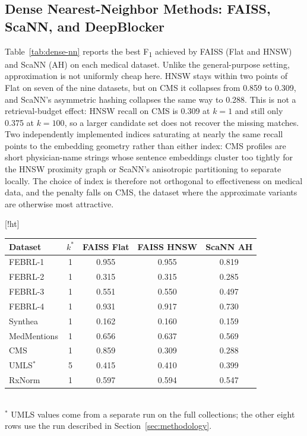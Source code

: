 \documentclass[runningheads]{llncs}
\makeatletter
\renewenvironment{table}
  {\setlength\abovecaptionskip{0\p@}%
   \setlength\belowcaptionskip{7\p@}%
   \@float{table}}
  {\end@float}
\makeatother
\begin{document}
\subsection{Dense Nearest-Neighbor Methods: FAISS, ScaNN, and DeepBlocker}
\label{sec:results-nn}

Table~\ref{tab:dense-nn} reports the best F\textsubscript{1} achieved by FAISS (Flat and HNSW)
and ScaNN (AH) on each medical dataset. Unlike the general-purpose setting, approximation is
not uniformly cheap here. HNSW stays within two points of Flat on seven of the nine datasets,
but on CMS it collapses from 0.859 to 0.309, and ScaNN's asymmetric hashing collapses the same
way to 0.288. This is not a retrieval-budget effect: HNSW recall on CMS is 0.309 at $k=1$ and
still only 0.375 at $k=100$, so a larger candidate set does not recover the missing matches.
Two independently implemented indices saturating at nearly the same recall points to the
embedding geometry rather than either index: CMS profiles are short physician-name strings
whose sentence embeddings cluster too tightly for the HNSW proximity graph or ScaNN's
anisotropic partitioning to separate locally. The choice of index is therefore not orthogonal to effectiveness on medical data, and the penalty falls on CMS, the dataset where the approximate variants are otherwise most attractive.

\begin{table}[!ht]
\centering
\caption{Dense NN best F\textsubscript{1} per medical dataset over
$k \in \{1,5,10,20,50,100\}$, using 384-dimensional \texttt{all-MiniLM-L6-v2} embeddings.
F\textsubscript{1} decreases monotonically in $k$ beyond $k^{*}$. Only F\textsubscript{1} is
shown: at $k^{*}=1$ on the datasets where $|D_1| = |D_2| = |GT|$ each query returns exactly one
candidate, so PC = PQ = F\textsubscript{1} by construction.}
\label{tab:dense-nn}
\begin{tabular}{lcccc}
\toprule
\textbf{Dataset} & \textbf{$k^{*}$} & \textbf{FAISS Flat} & \textbf{FAISS HNSW} & \textbf{ScaNN AH} \\
\midrule
FEBRL-1      & 1 & 0.955 & 0.955 & 0.819 \\
FEBRL-2      & 1 & 0.315 & 0.315 & 0.285 \\
FEBRL-3      & 1 & 0.551 & 0.550 & 0.497 \\
FEBRL-4      & 1 & 0.931 & 0.917 & 0.730 \\
Synthea      & 1 & 0.162 & 0.160 & 0.159 \\
MedMentions  & 1 & 0.656 & 0.637 & 0.569 \\
CMS          & 1 & 0.859 & 0.309 & 0.288 \\
UMLS$^{*}$   & 5 & 0.415 & 0.410 & 0.399 \\
RxNorm       & 1 & 0.597 & 0.594 & 0.547 \\
\bottomrule
\end{tabular}
\vspace{2pt}
\\ \footnotesize $^{*}$ UMLS values come from a separate run on the full collections; the other
eight rows use the run described in Section~\ref{sec:methodology}.
\end{table}
\end{document}
